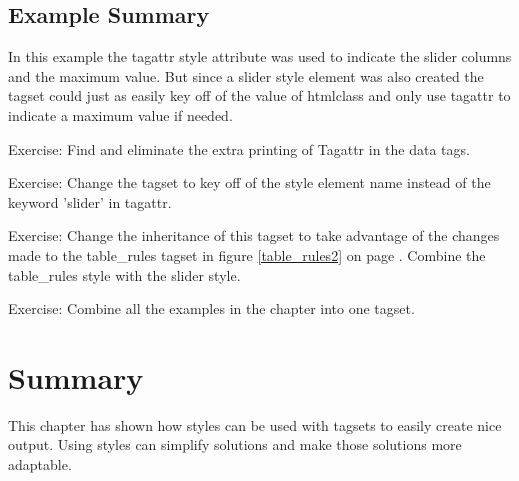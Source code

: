 \subsection{Example Summary}
In this example the tagattr style attribute was used to indicate the 
slider columns and the
maximum value.  But since a slider style element was also created the
tagset could just as easily key off of the value of htmlclass and only 
use tagattr to indicate a maximum value if needed.

Exercise: Find and eliminate the extra printing of Tagattr in the data tags.

Exercise: Change the tagset to key off of the style element name instead of
the keyword 'slider' in tagattr.

Exercise: Change the inheritance of this tagset to take advantage of the
changes made to the table\_rules tagset in figure \ref{table_rules2} on page
\pageref{table_rules2}. Combine the table\_rules style with
the slider style.

Exercise: Combine all the examples in the chapter into one tagset.

\section{Summary}
This chapter has shown how styles can be used with tagsets to easily create
nice output.  Using styles can simplify solutions and make those solutions
more adaptable. 
